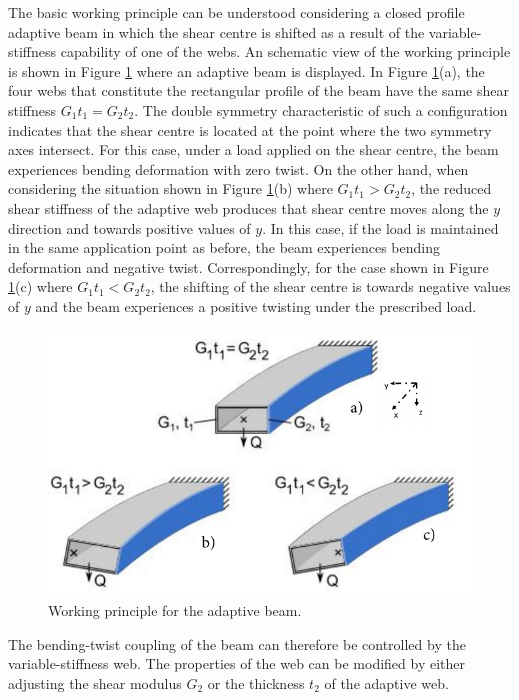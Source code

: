   The basic working principle can be understood considering a closed profile adaptive beam in which the shear centre is shifted as a result of the variable-stiffness capability of one of the webs. An schematic view of the working principle is shown in Figure \ref{fig:adaptive-beam-concept} where an adaptive beam is displayed. In Figure \ref{fig:adaptive-beam-concept}(a), the four webs that constitute the rectangular profile of the beam have the same shear stiffness $G_1 t_1 = G_2 t_2$. The double symmetry characteristic of such a configuration indicates that the shear centre is located at the point where the two symmetry axes intersect. For this case, under a load applied on the shear centre, the beam experiences bending deformation with zero twist. On the other hand, when considering the situation shown in Figure \ref{fig:adaptive-beam-concept}(b) where $G_1 t_1 > G_2 t_2$, the reduced shear stiffness of the adaptive web produces that shear centre moves along the $y$ direction and towards positive values of $y$. In this case, if the load is maintained in the same application point as before, the beam experiences bending deformation and negative twist. Correspondingly, for the case shown in Figure \ref{fig:adaptive-beam-concept}(c) where $G_1 t_1 < G_2 t_2$, the shifting of the shear centre is towards negative values of $y$ and the beam experiences a positive twisting under the prescribed load.

  \begin{figure}[!htpb]
    \centering
    \includegraphics[width=0.7 \textwidth]{figures/state-of-the-art/adaptive-beam-concept}
    \caption[Working principle for the adaptive beam]{Working principle for the adaptive beam. \cite{Raither2013}}\label{fig:adaptive-beam-concept}
  \end{figure}

  The bending-twist coupling of the beam can therefore be controlled by the variable-stiffness web. The properties of the web can be modified by either adjusting the shear modulus $G_2$ or the thickness $t_2$ of the adaptive web. 

